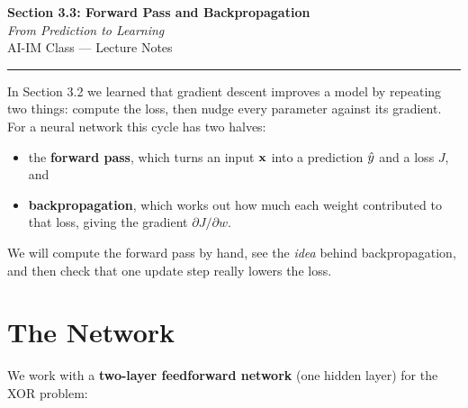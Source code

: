 \documentclass[12pt, a4paper]{article}
\begin{document}
\begin{center}
  {\LARGE \textbf{Section 3.3: Forward Pass and Backpropagation}} \\[0.3em]
  {\large\itshape From Prediction to Learning} \\[0.5em]
  {\large AI-IM Class --- Lecture Notes}%
  \ifstudentmode
  \fi
\end{center}

\vspace{1em}
\hrule
\vspace{1.5em}

In Section 3.2 we learned that gradient descent improves a model by
repeating two things: compute the loss, then nudge every parameter against
its gradient. For a neural network this cycle has two halves:
\begin{itemize}[nosep]
  \item the \textbf{forward pass}, which turns an input $\mathbf{x}$ into a
        prediction $\hat{y}$ and a loss $J$, and
  \item \textbf{backpropagation}, which works out how much each weight
        contributed to that loss, giving the gradient $\partial J/\partial w$.
\end{itemize}
We will compute the forward pass by hand, see the \emph{idea} behind
backpropagation, and then check that one update step really lowers the loss.

\section{The Network}

We work with a \textbf{two-layer feedforward network} (one hidden layer)
for the XOR problem:
\end{document}
